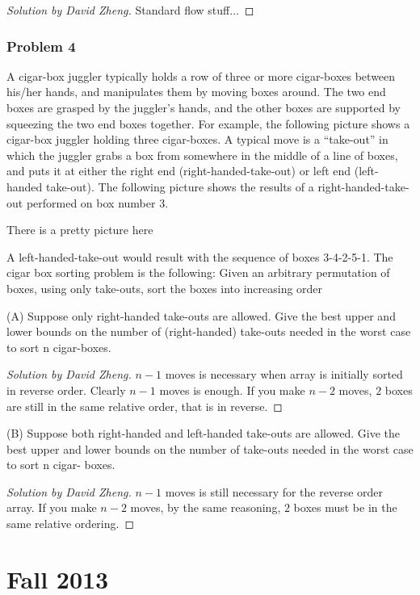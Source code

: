\documentclass{article}
\newenvironment{solution}[1]{\begin{proof}[Solution by #1]}{\end{proof}}
\begin{document}
\begin{solution}{David Zheng}
Standard flow stuff...
\end{solution}

\subsubsection{Problem 4}
A cigar-box juggler typically holds a row of three or more cigar-boxes between his/her
hands, and manipulates them by moving boxes around. The two end boxes are grasped by the
juggler’s hands, and the other boxes are supported by squeezing the two end boxes together.
For example, the following picture shows a cigar-box juggler holding three cigar-boxes.
A typical move is a ``take-out” in which the juggler grabs a box from somewhere in the
middle of a line of boxes, and puts it at either the right end (right-handed-take-out) or left
end (left-handed take-out). The following picture shows the results of a right-handed-take-
out performed on box number 3.

There is a pretty picture here

A left-handed-take-out would result with the sequence of boxes 3-4-2-5-1.
The cigar box sorting problem is the following: Given an arbitrary permutation of boxes,
using only take-outs, sort the boxes into increasing order

(A) Suppose only right-handed take-outs are allowed. Give the best upper and lower bounds
on the number of (right-handed) take-outs needed in the worst case to sort n cigar-boxes.

\begin{solution}{David Zheng}
    $n-1$ moves is necessary when array is initially sorted in reverse order.
    Clearly $n-1$ moves is enough.
    If you make $n-2$ moves, $2$ boxes are still in the same relative order, that is in reverse.
\end{solution}

(B) Suppose both right-handed and left-handed take-outs are allowed. Give the best upper
and lower bounds on the number of take-outs needed in the worst case to sort n cigar-
boxes.
\begin{solution}{David Zheng}
    $n-1$ moves is still necessary for the reverse order array.
    If you make $n-2$ moves, by the same reasoning, $2$ boxes must be in the same relative ordering.
\end{solution}


\section{Fall 2013}
\end{document}
